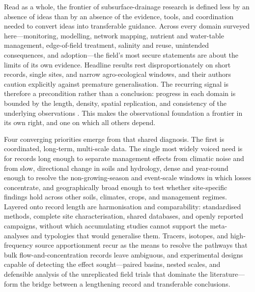 Read as a whole, the frontier of subsurface-drainage research is defined
less by an absence of ideas than by an absence of the evidence, tools, and
coordination needed to convert ideas into transferable guidance. Across
every domain surveyed here---monitoring, modelling, network mapping,
nutrient and water-table management, edge-of-field treatment, salinity and
reuse, unintended consequences, and adoption---the field's most secure
statements are about the limits of its own evidence. Headline results rest
disproportionately on short records, single sites, and narrow
agro-ecological windows, and their authors caution explicitly against
premature generalisation. The recurring signal is therefore a precondition
rather than a conclusion: progress in each domain is bounded by the length,
density, spatial replication, and consistency of the underlying
observations \parencite{Rogger2017,Kladivko2001}. This makes the observational foundation a frontier in its own
right, and one on which all others depend.

Four converging priorities emerge from that shared diagnosis. The first is
coordinated, long-term, multi-scale data. The single most widely voiced need
is for records long enough to separate management effects from climatic
noise and from slow, directional change in soils and hydrology, dense and
year-round enough to resolve the non-growing-season and event-scale windows
in which losses concentrate, and geographically broad enough to test whether
site-specific findings hold across other soils, climates, crops, and
management regimes. Layered onto record length are harmonisation and
comparability: standardised methods, complete site characterisation,
shared databases, and openly reported campaigns, without which accumulating
studies cannot support the meta-analyses and typologies that would
generalise them. Tracers, isotopes, and high-frequency source
apportionment recur as the means to resolve the pathways that bulk
flow-and-concentration records leave ambiguous, and experimental designs
capable of detecting the effect sought---paired basins, nested scales,
and defensible analysis of the unreplicated field trials that dominate the
literature---form the bridge between a lengthening record and transferable
conclusions.

